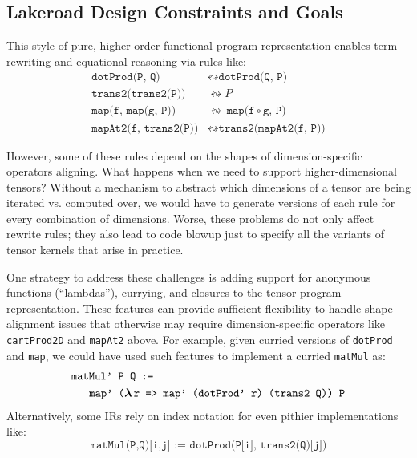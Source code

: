 \documentclass[prologue, dvipsnames, sigplan, screen, review, anonymous]{acmart}
\newcommand{\g}{Lakeroad\xspace}
\newcommand{\tcd}[1]{\texttt{#1}}
\newcommand{\mcd}[1]{\mathrm{\tcd{#1}}}
\begin{document}
\subsection{\g Design Constraints and Goals}

This style of pure, higher-order functional
  program representation enables
  term rewriting and equational reasoning
  via rules like:
\begin{align*}
  \mcd{dotProd(P, Q)}
    & \leftrightsquigarrow
      \mcd{dotProd(Q, P)} \\[2pt]
  \mcd{trans2(trans2(P))}
    & \leftrightsquigarrow
      P \\[2pt]
  \mcd{map(f, map(g, P))}
    & \leftrightsquigarrow
      \mcd{map(f$\,\circ\,$g, P)} \\[2pt]
  \mcd{mapAt2(f, trans2(P))}
    & \leftrightsquigarrow
      \mcd{trans2(mapAt2(f, P))} %
\end{align*}


However, some of these rules depend on the
  shapes of dimension-specific operators aligning.
What happens when we need to support
  higher-dimensional tensors?
Without a mechanism to abstract
  which dimensions of a tensor
  are being iterated vs. computed over,
  we would have to generate versions of
  each rule for every combination of dimensions.
Worse, these problems
  do not only affect rewrite rules;
  they also lead to code blowup just to
  specify all the variants of tensor kernels
  that arise in practice.

One strategy to address these challenges is
  adding support for anonymous functions (``lambdas''),
  currying, and closures to the 
  tensor program representation.
These features can provide sufficient
  flexibility to handle shape alignment
  issues that otherwise may require
  dimension-specific operators like
  \tcd{cartProd2D} and \tcd{mapAt2} above.
For example, given curried versions
  of \tcd{dotProd} and \tcd{map},
  we could have used such features
  to implement a curried \tcd{matMul} as:
\begin{align*}
  & \mcd{matMul' P Q :=} \\
  & \;\; \mcd{ \
      map' ($\boldsymbol\lambda\,$r =>\
        map' (dotProd' r) (trans2 Q)) P}
\end{align*}
Alternatively, some IRs rely on index notation
  for even pithier implementations like:
$$
  \mcd{matMul(P,Q)[i,j] := dotProd(P[i], trans2(Q)[j])}
$$
\end{document}
